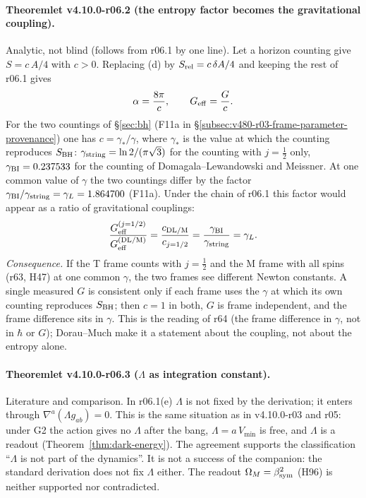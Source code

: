 \paragraph{Theoremlet v4.10.0-r06.2 (the entropy factor becomes the gravitational coupling).}
Analytic, not blind (follows from r06.1 by one line).  Let a horizon counting give \(S=c\,A/4\) with \(c>0\).  Replacing (d) by
\(S_{\rm rel}=c\,\delta A/4\) and keeping the rest of r06.1 gives
\[
\alpha=\frac{8\pi}{c},\qquad G_{\rm eff}=\frac{G}{c}.
\]
For the two countings of \S\ref{sec:bh} (F11a in \S\ref{subsec:v480-r03-frame-parameter-provenance}) one has \(c=\gamma_*/\gamma\), where \(\gamma_*\) is the value
at which the counting reproduces \(S_{\rm BH}\): \(\gamma_{\rm string}=\ln2/(\pi\sqrt3)\) for the counting with \(j=\tfrac12\) only, \(\gamma_{\rm BI}=0.237533\) for
the counting of Domagala--Lewandowski and Meissner.  At one common value of \(\gamma\) the two countings differ by the factor
\(\gamma_{\rm BI}/\gamma_{\rm string}=\gamma_L=1.864700\) (F11a).  Under the chain of r06.1 this factor would appear as a ratio of gravitational couplings:
\[
\frac{G_{\rm eff}^{(j=1/2)}}{G_{\rm eff}^{(\rm DL/M)}}=\frac{c_{\rm DL/M}}{c_{j=1/2}}=\frac{\gamma_{\rm BI}}{\gamma_{\rm string}}=\gamma_L .
\]
\emph{Consequence.} If the T frame counts with \(j=\tfrac12\) and the M frame with all spins (r63, H47) at one common \(\gamma\), the two frames see different
Newton constants.  A single measured \(G\) is consistent only if each frame uses the \(\gamma\) at which its own counting reproduces \(S_{\rm BH}\); then
\(c=1\) in both, \(G\) is frame independent, and the frame difference sits in \(\gamma\).  This is the reading of r64 (the frame difference in \(\gamma\), not in
\(\hbar\) or \(G\)); Dorau--Much make it a statement about the coupling, not about the entropy alone.

\paragraph{Theoremlet v4.10.0-r06.3 (\(\Lambda\) as integration constant).}
Literature and comparison.  In r06.1(e) \(\Lambda\) is not fixed by the derivation; it enters through \(\nabla^a(\Lambda g_{ab})=0\).  This is the same situation
as in v4.10.0-r03 and r05: under G2 the action gives no \(\Lambda\) after the bang, \(\Lambda=a\,V_{\min}\) is free, and \(\Lambda\) is a readout
(Theorem~\ref{thm:dark-energy}).  The agreement supports the classification ``\(\Lambda\) is not part of the dynamics''.  It is not a success of the companion:
the standard derivation does not fix \(\Lambda\) either.  The readout \(\Omega_M=\beta_{\rm sym}^2\) (H96) is neither supported nor contradicted.


